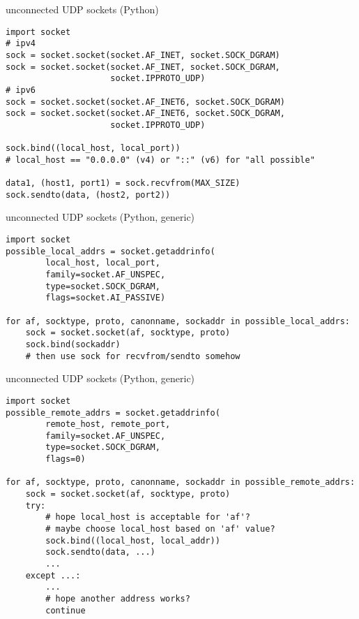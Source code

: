\begin{frame}[fragile]{unconnected UDP sockets (Python)}
\begin{Verbatim}[fontsize=\small]
import socket
# ipv4
sock = socket.socket(socket.AF_INET, socket.SOCK_DGRAM)
sock = socket.socket(socket.AF_INET, socket.SOCK_DGRAM,
                     socket.IPPROTO_UDP)
# ipv6
sock = socket.socket(socket.AF_INET6, socket.SOCK_DGRAM)
sock = socket.socket(socket.AF_INET6, socket.SOCK_DGRAM,
                     socket.IPPROTO_UDP)

sock.bind((local_host, local_port))
# local_host == "0.0.0.0" (v4) or "::" (v6) for "all possible"

data1, (host1, port1) = sock.recvfrom(MAX_SIZE)
sock.sendto(data, (host2, port2))
\end{Verbatim}
\end{frame}

\begin{frame}[fragile]{unconnected UDP sockets (Python, generic)}
\begin{Verbatim}[fontsize=\fontsize{9}{10}\selectfont]
import socket
possible_local_addrs = socket.getaddrinfo(
        local_host, local_port,
        family=socket.AF_UNSPEC,
        type=socket.SOCK_DGRAM,
        flags=socket.AI_PASSIVE)

for af, socktype, proto, canonname, sockaddr in possible_local_addrs:
    sock = socket.socket(af, socktype, proto)
    sock.bind(sockaddr)
    # then use sock for recvfrom/sendto somehow
\end{Verbatim}
\end{frame}

\begin{frame}[fragile]{unconnected UDP sockets (Python, generic)}
\begin{Verbatim}[fontsize=\fontsize{9}{10}\selectfont]
import socket
possible_remote_addrs = socket.getaddrinfo(
        remote_host, remote_port,
        family=socket.AF_UNSPEC,
        type=socket.SOCK_DGRAM,
        flags=0)

for af, socktype, proto, canonname, sockaddr in possible_remote_addrs:
    sock = socket.socket(af, socktype, proto)
    try:
        # hope local_host is acceptable for 'af'?
        # maybe choose local_host based on 'af' value?
        sock.bind((local_host, local_addr))
        sock.sendto(data, ...)
        ...
    except ...:
        ...
        # hope another address works?
        continue
\end{Verbatim}
\end{frame}

